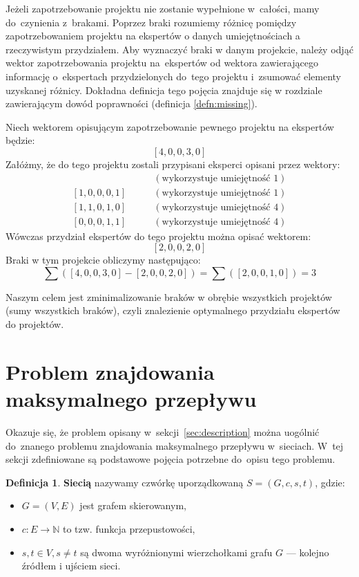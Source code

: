 \documentclass[12pt,a4paper]{article}
\theoremstyle{definition}
\newtheorem{defn}{Definicja}
\begin{document}
\noindent
Jeżeli zapotrzebowanie projektu nie zostanie wypełnione w~całości, mamy do~czynienia z~brakami. Poprzez braki rozumiemy różnicę pomiędzy zapotrzebowaniem projektu na ekspertów o danych umiejętnościach a rzeczywistym przydziałem. Aby wyznaczyć braki w danym projekcie, należy odjąć wektor zapotrzebowania projektu na~ekspertów od wektora zawierającego informację o~ekspertach przydzielonych do~tego projektu i~zsumować elementy uzyskanej różnicy. Dokładna definicja tego pojęcia znajduje się w rozdziale zawierającym dowód poprawności (definicja \ref{defn:missing}).\\

\begin{tcolorbox}[title=Przykład --- obliczanie liczby braków]
Niech wektorem opisującym zapotrzebowanie pewnego projektu na ekspertów będzie:
$$[4, 0, 0, 3, 0]$$
Załóżmy, że do tego projektu zostali przypisani eksperci opisani przez wektory:
\begin{align*}
[1, 0, 1, 0, 1] & \qquad (\text{wykorzystuje umiejętność }1) \\
[1, 0, 0, 0, 1] & \qquad (\text{wykorzystuje umiejętność }1) \\
[1, 1, 0, 1, 0] & \qquad (\text{wykorzystuje umiejętność }4) \\
[0, 0, 0, 1, 1] & \qquad (\text{wykorzystuje umiejętność }4)
\end{align*}
Wówczas przydział ekspertów do tego projektu można opisać wektorem:
$$[2, 0, 0, 2, 0]$$
Braki w tym projekcie obliczymy następująco:
$$\sum([4, 0, 0, 3, 0] - [2, 0, 0, 2, 0]) = \sum([2, 0, 0, 1, 0]) = 3$$
\end{tcolorbox}

\vspace{0.5em}
\noindent
Naszym celem jest zminimalizowanie braków w obrębie wszystkich projektów (sumy wszystkich braków), czyli znalezienie optymalnego przydziału ekspertów do projektów.

\section{Problem znajdowania maksymalnego przepływu}
\label{sec:maxflow}
Okazuje się, że problem opisany w~sekcji~\ref{sec:description} można uogólnić
do~znanego problemu znajdowania maksymalnego przepływu w~sieciach. W~tej sekcji
zdefiniowane są podstawowe pojęcia potrzebne do~opisu tego problemu.

\begin{defn}
\textbf{Siecią} nazywamy czwórkę uporządkowaną $S = (G,c,s,t)$, gdzie:
\begin{itemize}
	\item $G = (V,E)$ jest grafem skierowanym,
	\item $c : E \to \mathbb{N}$ to tzw. funkcja przepustowości,
	\item $s,t \in V, s \neq t$ są dwoma wyróżnionymi wierzchołkami grafu $G$
	--- kolejno źródłem i ujściem sieci.
\end{itemize}
\end{defn}
\end{document}
